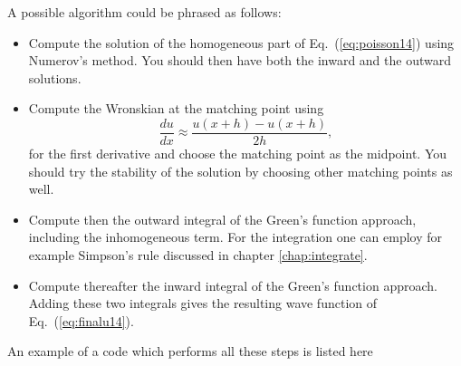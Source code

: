 A possible algorithm could be phrased as follows:
\begin{svgraybox}
\begin{itemize}
\item Compute the solution of the homogeneous part of Eq.~(\ref{eq:poisson14}) using Numerov's method.
You should then have both the inward and the outward solutions.
\item Compute the Wronskian  at the matching point using 
\[  \frac{du}{dx}\approx \frac{u(x+h)-u(x+h)}{2h},\]  for the first derivative
and choose the matching point as the midpoint.  You should try the stability of the solution 
by choosing other matching points as well.
\item Compute then the outward integral of the Green's function approach, including the inhomogeneous 
term.  For the integration one can employ for example Simpson's rule discussed in 
chapter \ref{chap:integrate}.
\item Compute thereafter the inward integral of the Green's function approach.
Adding these two integrals gives the resulting wave function of Eq.~(\ref{eq:finalu14}).
\end{itemize}
\end{svgraybox}
An example of a code which performs all these steps is listed here
